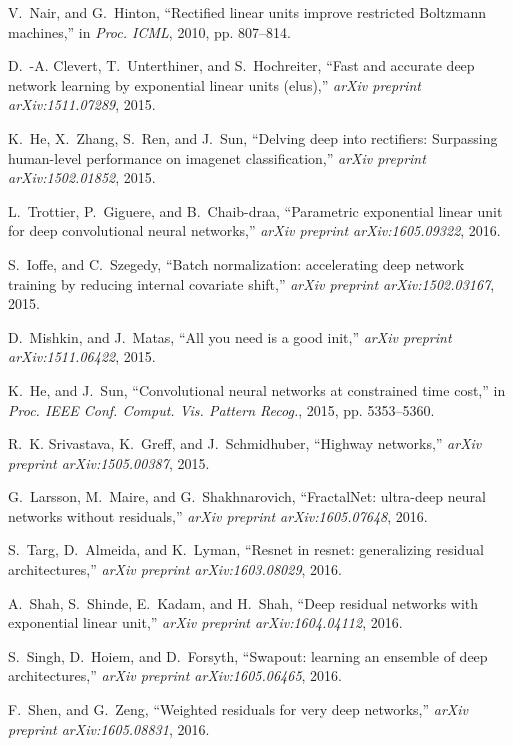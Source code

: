 \documentclass[journal]{IEEEtran}
\begin{document}
\begin{thebibliography}{1}
V.~Nair, and G.~Hinton, ``Rectified linear units improve restricted Boltzmann machines,'' in
  \emph{Proc. ICML}, 2010, pp. 807--814.

D.~-A. Clevert, T.~Unterthiner, and S.~Hochreiter, ``Fast and accurate deep network learning by exponential linear units (elus),'' \emph{arXiv preprint arXiv:1511.07289}, 2015. 

K.~He, X.~Zhang, S.~Ren, and J.~Sun, ``Delving deep into rectifiers: Surpassing human-level performance on imagenet classification,'' \emph{arXiv preprint arXiv:1502.01852}, 2015. 

L.~Trottier, P.~Giguere, and B.~Chaib-draa, ``Parametric exponential linear unit for deep convolutional neural networks,'' \emph{arXiv preprint arXiv:1605.09322}, 2016. 

S.~Ioffe, and C.~Szegedy, ``Batch normalization: accelerating deep network training by reducing internal covariate shift,'' \emph{arXiv preprint arXiv:1502.03167}, 2015. 

D.~Mishkin, and J.~Matas, ``All you need is a good init,'' \emph{arXiv preprint arXiv:1511.06422}, 2015.

K.~He, and J.~Sun, ``Convolutional neural networks at constrained time cost,'' in
  \emph{Proc. IEEE Conf. Comput. Vis. Pattern Recog.}, 2015, pp. 5353--5360.

R.~K. Srivastava, K.~Greff, and J.~Schmidhuber, ``Highway networks,'' \emph{arXiv preprint arXiv:1505.00387}, 2015. 

G.~Larsson, M.~Maire, and G.~Shakhnarovich, ``FractalNet: ultra-deep neural networks without residuals,'' \emph{arXiv preprint arXiv:1605.07648}, 2016. 

S.~Targ, D.~Almeida, and K.~Lyman, ``Resnet in resnet: generalizing residual architectures,'' \emph{arXiv preprint arXiv:1603.08029}, 2016. 

A.~Shah, S.~Shinde, E.~Kadam, and H.~Shah, ``Deep residual networks with exponential linear unit,'' \emph{arXiv preprint arXiv:1604.04112}, 2016. 

S.~Singh, D.~Hoiem, and D.~Forsyth, ``Swapout: learning an ensemble of deep architectures,'' \emph{arXiv preprint arXiv:1605.06465}, 2016.

F.~Shen, and G.~Zeng, ``Weighted residuals for very deep networks,'' \emph{arXiv preprint arXiv:1605.08831}, 2016.


\end{thebibliography}
\end{document}
